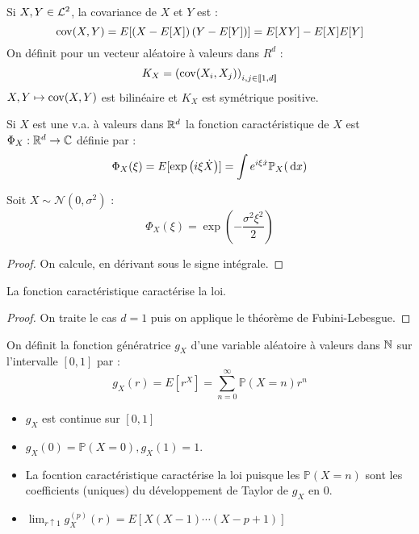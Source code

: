 \documentclass{cours}
\begin{document}
\begin{definition}
    Si $X, Y \in \mathcal{L}^{2}$, la covariance de $X$ et $Y$ est :
    \[
        \operatorname{cov}(X, Y) = E[\left(X - E[X]\right)\left(Y - E[Y]\right)] = E[XY] - E[X]E[Y]
    \]
    On définit pour un vecteur aléatoire à valeurs dans $R^{d}$ :
    \[
        K_{X} = \left(\operatorname{cov}(X_{i}, X_{j})\right)_{i, j \in \llbracket 1,d\rrbracket}
    \]
    $X, Y \mapsto \operatorname{cov}(X, Y)$ est bilinéaire et $K_{X}$ est symétrique positive.
\end{definition}

\begin{definition}
    Si $X$ est une v.a. à valeurs dans $\mathbb{R}^{d}$ la fonction caractéristique de $X$ est $\Phi_{X} : \mathbb{R}^{d} \rightarrow \mathbb{C}$ définie par :
    \[
        \Phi_{X}(\xi) = E[\exp\left(i\xi \dot X\right)] = \int e^{i\xi \dot x}\mathbb{P}_{X}({\rm \, d} x)
    \]
\end{definition}

\begin{lemma}
    Soit $X \sim \mathcal{N}(0, \sigma^{2})$ :
    \[
        \Phi_{X}(\xi) = \exp\left(-\frac{\sigma^{2}\xi^{2}}{2}\right)
    \]
\end{lemma}
\begin{proof}
    On calcule, en dérivant sous le signe intégrale.
\end{proof}

\begin{theorem}
    La fonction caractéristique caractérise la loi.
\end{theorem}
\begin{proof}
    On traite le cas $d = 1$ puis on applique le théorème de Fubini-Lebesgue.
\end{proof}

\begin{definition}
    On définit la fonction génératrice $g_{X}$ d'une variable aléatoire à valeurs dans $\mathbb{N}$ sur l'intervalle $\left[0, 1\right]$ par :
    \[
        g_{X}(r) = E[r^{X}] = \sum_{n = 0}^{\infty}\mathbb{P}(X = n)r^{n}
    \]
\end{definition}

\begin{proposition}
    \begin{itemize}
        \item $g_{X}$ est continue sur $\left[0, 1\right]$
        \item $g_{X}(0) = \mathbb{P}(X = 0), g_{X}(1) = 1$.
        \item La focntion caractéristique caractérise la loi puisque les $\mathbb{P}(X = n)$ sont les coefficients (uniques) du développement de Taylor de $g_{X}$ en $0$.
        \item $\lim_{r \uparrow 1}g_{X}^{(p)}(r) = E\left[X(X - 1)\cdots(X - p + 1)\right]$
    \end{itemize}
\end{proposition}
\end{document}
